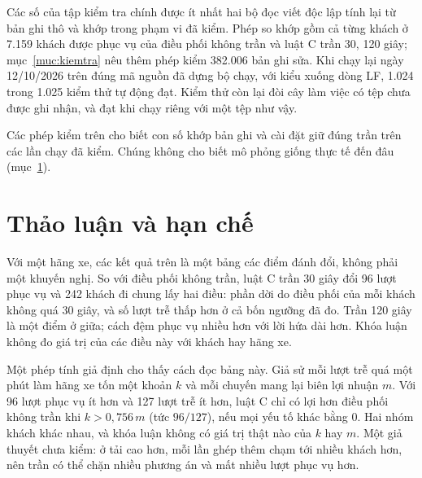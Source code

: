 Các số của tập kiểm tra chính được ít nhất hai bộ đọc viết độc lập tính lại từ bản ghi thô và khớp trong phạm vi đã
kiểm. Phép so khớp gồm cả từng khách ở 7.159 khách được phục vụ của điều phối không trần và luật C trần 30, 120 giây;
mục~\ref{muc:kiemtra} nêu thêm phép kiểm 382.006 bản ghi sửa. Khi chạy lại ngày 12/10/2026 trên đúng mã nguồn đã dựng
bộ chạy, với kiểu xuống dòng LF, 1.024 trong 1.025 kiểm thử tự động đạt. Kiểm thử còn lại đòi cây làm việc có tệp chưa
được ghi nhận, và đạt khi chạy riêng với một tệp như vậy.

Các phép kiểm trên cho biết con số khớp bản ghi và cài đặt giữ đúng trần trên các lần chạy đã kiểm. Chúng không cho
biết mô phỏng giống thực tế đến đâu (mục~\ref{muc:c4-thaoluan}).

\section{Thảo luận và hạn chế}
\label{muc:c4-thaoluan}

Với một hãng xe, các kết quả trên là một bảng các điểm đánh đổi, không phải một khuyến nghị. So với điều phối không
trần, luật C trần 30 giây đổi 96 lượt phục vụ và 242 khách đi chung lấy hai điều: phần dời do điều phối của mỗi khách
không quá 30 giây, và số lượt trễ thấp hơn ở cả bốn ngưỡng đã đo. Trần 120 giây là một điểm ở giữa; cách đệm phục vụ
nhiều hơn với lời hứa dài hơn. Khóa luận không đo giá trị của các điều này với khách hay hãng xe.

Một phép tính giả định cho thấy cách đọc bảng này. Giả sử mỗi lượt trễ quá một phút làm hãng xe tốn một khoản $k$ và
mỗi chuyến mang lại biên lợi nhuận $m$. Với 96 lượt phục vụ ít hơn và 127 lượt trễ ít hơn, luật C chỉ có lợi hơn điều
phối không trần khi $k > 0{,}756\,m$ (tức $96/127$), nếu mọi yếu tố khác bằng 0. Hai nhóm khách khác nhau, và khóa
luận không có giá trị thật nào của $k$ hay $m$. Một giả thuyết chưa kiểm: ở tải cao hơn, mỗi lần ghép thêm chạm tới
nhiều khách hơn, nên trần có thể chặn nhiều phương án và mất nhiều lượt phục vụ hơn.

